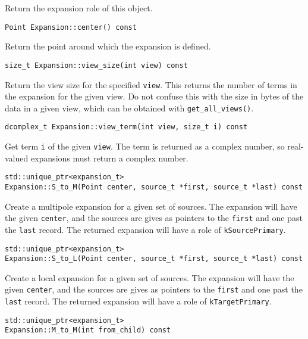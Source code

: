 \noindent Return the expansion role of this object.

\begin{lstlisting}
Point Expansion::center() const
\end{lstlisting}

\noindent Return the point around which the expansion is defined.

\begin{lstlisting}
size_t Expansion::view_size(int view) const
\end{lstlisting}

\noindent Return the view size for the specified \texttt{view}. This returns
the number of terms in the expansion for the given view. Do not confuse this
with the size in bytes of the data in a given view, which can be obtained with
\texttt{get\_all\_views()}.

\begin{lstlisting}
dcomplex_t Expansion::view_term(int view, size_t i) const
\end{lstlisting}

\noindent Get term \texttt{i} of the given \texttt{view}. The term is returned
as a complex number, so real-valued expansions must return a complex number.

\begin{lstlisting}
std::unique_ptr<expansion_t>
Expansion::S_to_M(Point center, source_t *first, source_t *last) const
\end{lstlisting}

\noindent Create a multipole expansion for a given set of sources. The
expansion will have the given \texttt{center}, and the sources are gives as
pointers to the \texttt{first} and one past the \texttt{last} record.
The returned expansion will have a role of \texttt{kSourcePrimary}.

\begin{lstlisting}
std::unique_ptr<expansion_t>
Expansion::S_to_L(Point center, source_t *first, source_t *last) const
\end{lstlisting}

\noindent Create a local expansion for a given set of sources. The expansion
will have the given \texttt{center}, and the sources are gives as pointers to
the \texttt{first} and one past the \texttt{last} record.
The returned expansion will have a role of \texttt{kTargetPrimary}.

\begin{lstlisting}
std::unique_ptr<expansion_t>
Expansion::M_to_M(int from_child) const
\end{lstlisting}

